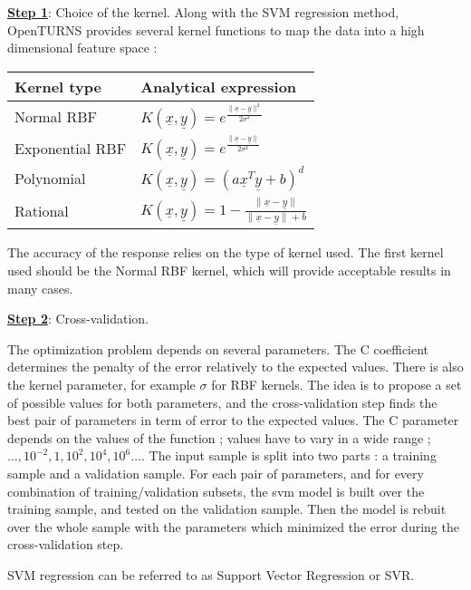 {  \vspace{2mm}

  \underline{\textbf{Step 1}}: Choice of the kernel. Along with the SVM regression method, OpenTURNS provides several kernel functions to map the data into a high dimensional feature space :

  \begin{center}
    \begin{tabular}{ll}
      Kernel type & Analytical expression \\
      \hline
      Normal RBF & $ K(\underline{x}, \underline{y}) = e^{\frac{\| \underline{x} - \underline{y} \|^2}{2\sigma^2}} $ \\
      Exponential RBF & $ K(\underline{x}, \underline{y}) = e^{\frac{\| \underline{x} - \underline{y} \|}{2\sigma^2}} $ \\
      Polynomial & $ K(\underline{x}, \underline{y}) = (a\underline{x}^T\underline{y} + b)^d $ \\
      Rational & $ K(\underline{x}, \underline{y}) = 1 - \frac{\| \underline{x} - \underline{y} \|}{\| \underline{x} - \underline{y} \| + b} $
    \end{tabular}
  \end{center}

  The accuracy of the response relies on the type of kernel used. The first kernel used should be the Normal RBF kernel, which will provide acceptable results in many cases.

  \vspace{2mm}

  \underline{\textbf{Step 2}}: Cross-validation.

  The optimization problem depends on several parameters. The C coefficient determines the penalty of the error relatively to the expected values. There is also the kernel parameter, for example $\sigma$ for RBF kernels. The idea is to propose a set of possible values for both parameters, and the cross-validation step finds the best pair of parameters in term of error to the expected values. The C parameter depends on the values of the function ; values have to vary in a wide range ; $..., 10^{-2}, 1, 10^2, 10^4, 10^6...$.
  The input sample is split into two parts : a training sample and a validation sample. For each pair of parameters, and for every combination of training/validation subsets, the svm model is built over the training sample, and tested on the validation sample. Then the model is rebuit over the whole sample with the parameters which minimized the error during the cross-validation step.
}
{
  SVM regression can be referred to as Support Vector Regression or SVR.
}

